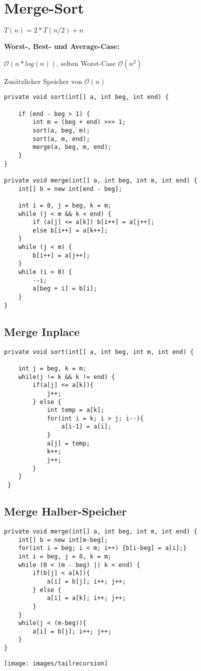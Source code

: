 \section*{Merge-Sort}

$T(n) = 2*T(n/2) + n$

\textbf{Worst-, Best- und Average-Case:} 

$\mathcal{O}(n*log(n))$, selten Worst-Case $\mathcal{O}(n^2)$

Zusätzlicher Speicher von $\mathcal{O}(n)$

\begin{verbatim}
private void sort(int[] a, int beg, int end) {

    if (end - beg > 1) {
        int m = (beg + end) >>> 1;
        sort(a, beg, m);
        sort(a, m, end);
        merge(a, beg, m, end);
    }
}

private void merge(int[] a, int beg, int m, int end) {
    int[] b = new int[end - beg];

    int i = 0, j = beg, k = m;
    while (j < m && k < end) {
        if (a[j] <= a[k]) b[i++] = a[j++];
        else b[i++] = a[k++];
    }
    while (j < m) {
        b[i++] = a[j++];
    }
    while (i > 0) {
        --i;
        a[beg + i] = b[i];
    }
}
\end{verbatim}

\subsection*{Merge Inplace}

\begin{verbatim}
private void sort(int[] a, int beg, int m, int end) {

	int j = beg, k = m;
	while(j != k && k != end) {
		if(a[j] <= a[k]){
			j++;
		} else {
			int temp = a[k];
			for(int i = k; i > j; i--){
				a[i-1] = a[i];
			}
			a[j] = temp;
			k++;
			j++;
		}
	}
 }
\end{verbatim}

\subsection*{Merge Halber-Speicher}

\begin{verbatim}
private void merge(int[] a, int beg, int m, int end) {
	int[] b = new int[m-beg];
	for(int i = beg; i < m; i++) {b[i-beg] = a[i];}
	int i = beg, j = 0, k = m;
	while (0 < (m - beg) || k < end) {
		if(b[j] < a[k]){
			a[i] = b[j]; i++; j++;
		} else {
			a[i] = a[k]; i++; j++;
		}	
	}
	while(j < (m-beg)){
		a[i] = b[j]; i++; j++;
	}
}
\end{verbatim}

\texttt{[image: images/tailrecursion]}
